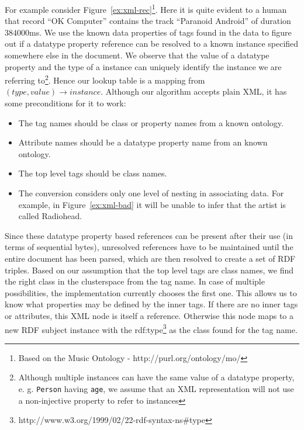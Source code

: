 \documentclass[journal]{IEEEtran}
\begin{document}
For example consider Figure~\ref{ex:xml-rec}\footnote{Based on the Music
Ontology - http://purl.org/ontology/mo/}. Here it is quite evident to a human
that record ``OK Computer'' contains the track ``Paranoid Android'' of duration
384000ms. We use the known data properties of tags found in the data to figure
out if a datatype property reference can be resolved to a known instance
specified somewhere else in the document. We observe that the value of
a datatype property and the type of a instance can uniquely identify the
instance we are referring to\footnote{Although multiple instances can have the
    same value of a datatype property, e. g. \texttt{Person} having
    \texttt{age}, we assume that an XML representation will not use
a non-injective property to refer to instances}. Hence our lookup table is
a mapping from $(type, value)\rightarrow instance$. Although our algorithm
accepts plain XML, it has some preconditions for it to work:

\begin{itemize}
    \item The tag names should be class or property names from a known ontology.
    \item Attribute names should be a datatype property name from an known
        ontology.
    \item The top level tags should be class names.
    \item The conversion considers only one level of nesting in associating
        data. For example, in Figure~\ref{ex:xml-bad} it will be unable to
        infer that the artist is called Radiohead.
\end{itemize}

Since these datatype property based references can be present after their use
(in terms of sequential bytes), unresolved references have to be maintained
until the entire document has been parsed, which are then resolved to create
a set of RDF triples. Based on our assumption that the top level tags are class
names, we find the right class in the clusterspace from the tag name. In case
of multiple possibilities, the implementation currently chooses the first one.
This allows us to know what properties may be defined by the inner tags. If
there are no inner tags or attributes, this XML node is itself a reference.
Otherwise this node maps to a new RDF subject instance with the
rdf:type\footnote{http://www.w3.org/1999/02/22-rdf-syntax-ns\#type} as the
class found for the tag name.
\end{document}
